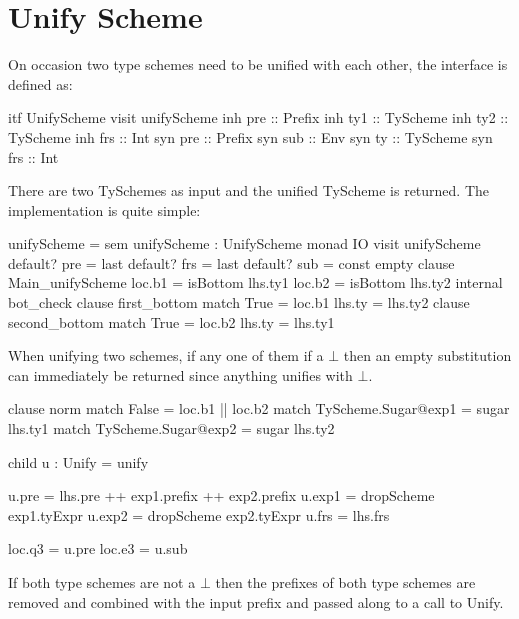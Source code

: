 \section{Unify Scheme} 
On occasion two type schemes need to be unified with each other, the interface is defined as:

\begin{code}
itf UnifyScheme
  visit unifyScheme
    inh pre  :: Prefix
    inh ty1  :: TyScheme
    inh ty2  :: TyScheme
    inh frs  :: Int
    syn pre  :: Prefix
    syn sub  :: Env
    syn ty   :: TyScheme
    syn frs  :: Int 
\end{code}

There are two TySchemes as input and the unified TyScheme is returned. The implementation is quite simple:

\begin{code}
unifyScheme = sem unifyScheme : UnifyScheme monad IO
                visit unifyScheme
                  default? pre = last
                  default? frs = last
                  default? sub = const empty
                  clause Main_unifyScheme
                      loc.b1 = isBottom lhs.ty1
                      loc.b2 = isBottom lhs.ty2
                      internal bot_check
                        clause first_bottom
                            match True = loc.b1
                            lhs.ty     = lhs.ty2
                        clause second_bottom
                            match True = loc.b2
                            lhs.ty     = lhs.ty1
\end{code}
When unifying two schemes, if any one of them if a $\bot$ then an empty substitution can immediately be returned since anything unifies with $\bot$. 

\begin{code}
clause norm
    match False = loc.b1 || loc.b2
    match TyScheme.Sugar@exp1 = sugar lhs.ty1
    match TyScheme.Sugar@exp2 = sugar lhs.ty2
        
    child u : Unify = unify
        
    u.pre  = lhs.pre ++ exp1.prefix ++ exp2.prefix
    u.exp1 = dropScheme exp1.tyExpr
    u.exp2 = dropScheme exp2.tyExpr
    u.frs  = lhs.frs
        
    loc.q3 = u.pre
    loc.e3 = u.sub
\end{code}
If both type schemes are not a $\bot$ then the prefixes of both type schemes are removed and combined with the input prefix and passed along to a call to Unify.


